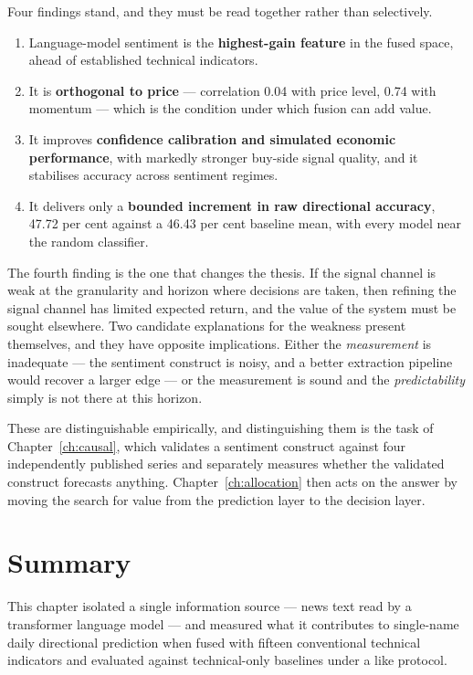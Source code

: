 Four findings stand, and they must be read together rather than selectively.

\begin{enumerate}
\item Language-model sentiment is the \textbf{highest-gain feature} in the fused space, ahead of
established technical indicators.
\item It is \textbf{orthogonal to price} --- correlation 0.04 with price level, 0.74 with
momentum --- which is the condition under which fusion can add value.
\item It improves \textbf{confidence calibration and simulated economic performance}, with
markedly stronger buy-side signal quality, and it stabilises accuracy across sentiment regimes.
\item It delivers only a \textbf{bounded increment in raw directional accuracy}, 47.72 per cent
against a 46.43 per cent baseline mean, with every model near the random classifier.
\end{enumerate}

The fourth finding is the one that changes the thesis. If the signal channel is weak at the
granularity and horizon where decisions are taken, then refining the signal channel has limited
expected return, and the value of the system must be sought elsewhere. Two candidate explanations
for the weakness present themselves, and they have opposite implications. Either the
\emph{measurement} is inadequate --- the sentiment construct is noisy, and a better extraction
pipeline would recover a larger edge --- or the measurement is sound and the \emph{predictability}
simply is not there at this horizon.

These are distinguishable empirically, and distinguishing them is the task of
Chapter~\ref{ch:causal}, which validates a sentiment construct against four independently
published series and separately measures whether the validated construct forecasts anything.
Chapter~\ref{ch:allocation} then acts on the answer by moving the search for value from the
prediction layer to the decision layer.

\section{Summary}

This chapter isolated a single information source --- news text read by a transformer language
model --- and measured what it contributes to single-name daily directional prediction when fused
with fifteen conventional technical indicators and evaluated against technical-only baselines
under a like protocol.

